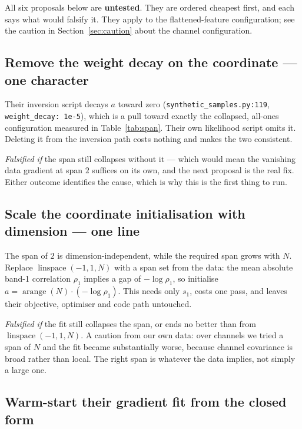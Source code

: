 \documentclass[11pt,a4paper]{article}
\newcommand{\code}[1]{\texttt{#1}}
\begin{document}
All six proposals below are \textbf{untested}. They are ordered cheapest first, and each says
what would falsify it. They apply to the flattened-feature configuration; see the caution in
Section~\ref{sec:caution} about the channel configuration.

\subsection{Remove the weight decay on the coordinate --- one character}

Their inversion script decays $a$ toward zero (\code{synthetic\_samples.py:119},
\code{weight\_decay: 1e-5}), which is a pull toward exactly the collapsed, all-ones
configuration measured in Table~\ref{tab:span}. Their own likelihood script omits it. Deleting
it from the inversion path costs nothing and makes the two consistent.

\emph{Falsified if} the span still collapses without it --- which would mean the vanishing
data gradient at span $2$ suffices on its own, and the next proposal is the real fix. Either
outcome identifies the cause, which is why this is the first thing to run.

\subsection{Scale the coordinate initialisation with dimension --- one line}

The span of $2$ is dimension-independent, while the required span grows with $N$. Replace
$\operatorname{linspace}(-1,1,N)$ with a span set from the data: the mean absolute band-1
correlation $\rho_1$ implies a gap of $-\log \rho_1$, so initialise
$a = \operatorname{arange}(N)\cdot(-\log\rho_1)$. This needs only $s_1$, costs one pass, and
leaves their objective, optimiser and code path untouched.

\emph{Falsified if} the fit still collapses the span, or ends no better than from
$\operatorname{linspace}(-1,1,N)$. A caution from our own data: over channels we tried a span of
$N$ and the fit became substantially worse, because channel covariance is broad rather than
local. The right span is whatever the data implies, not simply a large one.

\subsection{Warm-start their gradient fit from the closed form}
\end{document}
